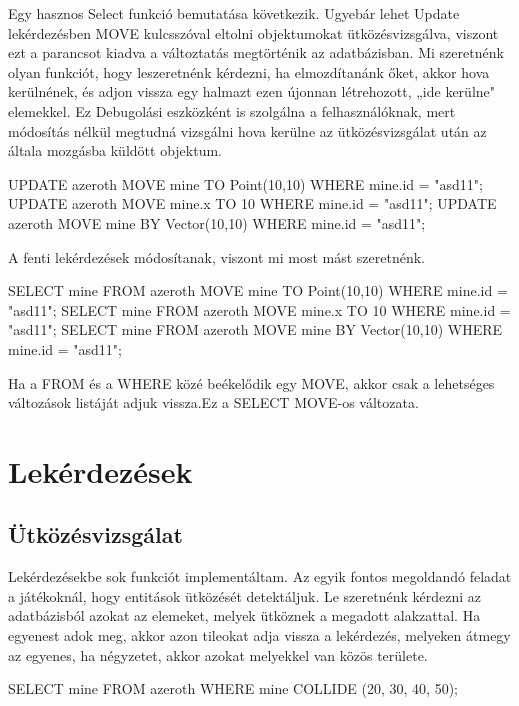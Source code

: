 \begin{sql}
Egy hasznos Select funkció bemutatása következik. Ugyebár lehet Update lekérdezésben MOVE kulcsszóval eltolni objektumokat ütközésvizsgálva, viszont ezt a parancsot kiadva a változtatás megtörténik az adatbázisban.
Mi szeretnénk olyan funkciót, hogy leszeretnénk kérdezni, ha elmozdítanánk őket, akkor hova kerülnének, és adjon vissza egy halmazt ezen újonnan létrehozott, „ide kerülne" elemekkel. Ez Debugolási eszközként is szolgálna a felhasználóknak, mert módosítás nélkül megtudná vizsgálni hova kerülne az ütközésvizsgálat után az általa mozgásba küldött objektum.
\begin{sql}
UPDATE azeroth MOVE  mine TO  Point(10,10) WHERE mine.id = "asd11"; 
UPDATE azeroth MOVE  mine.x TO 10 WHERE mine.id = "asd11"; 
UPDATE azeroth MOVE  mine BY  Vector(10,10) WHERE mine.id = "asd11"; 
\end{sql}
A fenti lekérdezések módosítanak, viszont mi most mást szeretnénk.

\begin{sql}
SELECT mine FROM azeroth MOVE  mine TO  Point(10,10) WHERE mine.id = "asd11"; 
SELECT mine FROM azeroth MOVE  mine.x TO 10 WHERE mine.id = "asd11"; 
SELECT mine FROM azeroth MOVE  mine BY  Vector(10,10) WHERE mine.id = "asd11";
\end{sql}

Ha a FROM és a WHERE közé beékelődik egy MOVE, akkor csak a lehetséges változások listáját adjuk vissza.Ez a SELECT MOVE-os változata.

\section{Lekérdezések}

\subsection{Ütközésvizsgálat}

Lekérdezésekbe sok funkciót implementáltam. Az egyik fontos megoldandó feladat a játékoknál, hogy entitások ütközését detektáljuk. 
Le szeretnénk kérdezni az adatbázisból azokat az elemeket, melyek ütköznek a megadott alakzattal. Ha egyenest adok meg, akkor azon tileokat adja vissza a lekérdezés, melyeken átmegy az egyenes, ha négyzetet, akkor azokat melyekkel van közös területe.

\begin{sql}
SELECT mine
FROM azeroth
WHERE mine COLLIDE (20, 30, 40, 50);
\end{sql}


\end{sql}
